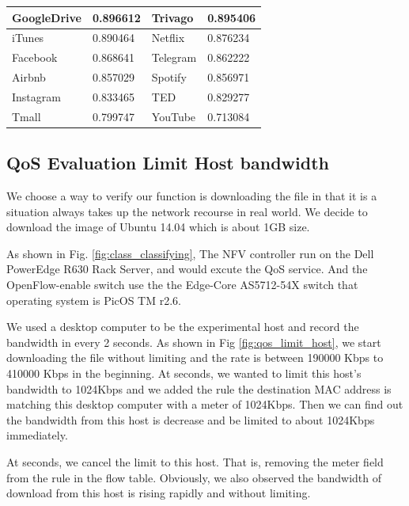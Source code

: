 \documentclass[journal]{IEEEtran}
\begin{document}
\begin{table}[!t]
\begin{tabular}{|l|l|l|l|}
GoogleDrive         & 0.896612            & Trivago           & 0.895406             \\ \hline
iTunes              & 0.890464            & Netflix           & 0.876234             \\ \hline
Facebook            & 0.868641            & Telegram          & 0.862222             \\ \hline
Airbnb              & 0.857029            & Spotify           & 0.856971             \\ \hline
Instagram           & 0.833465            & TED               & 0.829277             \\ \hline
Tmall               & 0.799747            & YouTube           & 0.713084             \\ \hline
\end{tabular}
\end{table}

\subsection{QoS Evaluation Limit Host bandwidth}

We choose a way to verify our function is downloading the file in that it is a situation always takes up the network recourse in real world. We decide to download the image of Ubuntu 14.04 which is about 1GB size.

As shown in Fig. \ref{fig:class_classifying}, The NFV controller run on the Dell PowerEdge R630 Rack Server, and would excute the QoS service. And the OpenFlow-enable switch use the the Edge-Core AS5712-54X\cite{edge-core-switch} switch that operating system is PicOS TM r2.6.

We used a desktop computer to be the experimental host and record the bandwidth in every 2 seconds. As shown in Fig \ref{fig:qos_limit_host}, we start downloading the file without limiting and the rate is between 190000 Kbps to 410000 Kbps in the beginning.
At  seconds, we wanted to limit this host’s bandwidth to 1024Kbps and we added the rule the destination MAC address is matching this desktop computer with a meter of 1024Kbps. Then we can find out the bandwidth from this host is decrease and be limited to about 1024Kbps immediately.

At  seconds, we cancel the limit to this host. That is, removing the meter field from the rule in the flow table. Obviously, we also observed the bandwidth of download from this host is rising rapidly and without limiting.
\end{document}

